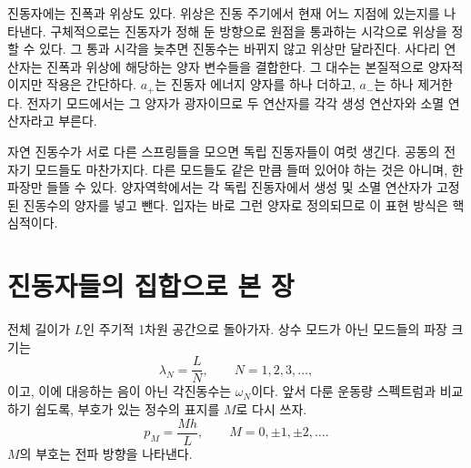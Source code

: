 진동자에는 진폭과 위상도 있다. 위상은 진동 주기에서 현재 어느 지점에 있는지를 나타낸다. 구체적으로는 진동자가 정해 둔 방향으로 원점을 통과하는 시각으로 위상을 정할 수 있다. 그 통과 시각을 늦추면 진동수는 바뀌지 않고 위상만 달라진다. 사다리 연산자는 진폭과 위상에 해당하는 양자 변수들을 결합한다. 그 대수는 본질적으로 양자적이지만 작용은 간단하다. \(a_+\)는 진동자 에너지 양자를 하나 더하고, \(a_-\)는 하나 제거한다. 전자기 모드에서는 그 양자가 광자이므로 두 연산자를 각각 생성 연산자와 소멸 연산자라고 부른다.

\begin{classroomqa}\end{classroomqa}

자연 진동수가 서로 다른 스프링들을 모으면 독립 진동자들이 여럿 생긴다. 공동의 전자기 모드들도 마찬가지다. 다른 모드들도 같은 만큼 들떠 있어야 하는 것은 아니며, 한 파장만 들뜰 수 있다. 양자역학에서는 각 독립 진동자에서 생성 및 소멸 연산자가 고정된 진동수의 양자를 넣고 뺀다. 입자는 바로 그런 양자로 정의되므로 이 표현 방식은 핵심적이다.

\section{진동자들의 집합으로 본 장}

전체 길이가 \(L\)인 주기적 1차원 공간으로 돌아가자. 상수 모드가 아닌 모드들의 파장 크기는 \begin{equation}
\lambda_N=\frac{L}{N},
\qquad N=1,2,3,\ldots ,
\end{equation}이고, 이에 대응하는 음이 아닌 각진동수는 \(\omega_N\)이다. 앞서 다룬 운동량 스펙트럼과 비교하기 쉽도록, 부호가 있는 정수의 표지를 \(M\)로 다시 쓰자. \begin{equation}
p_M=\frac{Mh}{L},
\qquad M=0,\pm1,\pm2,\ldots .
\end{equation} \(M\)의 부호는 전파 방향을 나타낸다. 

